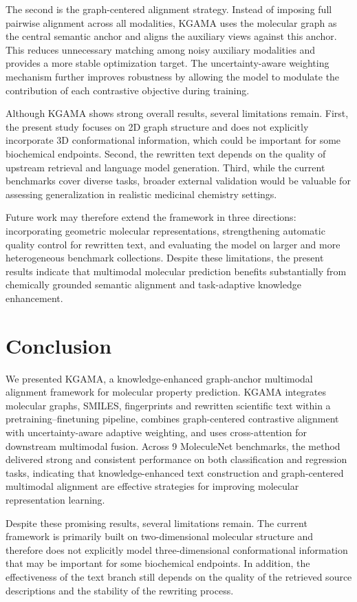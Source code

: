 \documentclass[webpdf,contemporary,large]{oup-authoring-template}%
\begin{document}
The second is the graph-centered alignment strategy. Instead of imposing full pairwise alignment across all modalities, KGAMA uses the molecular graph as the central semantic anchor and aligns the auxiliary views against this anchor. This reduces unnecessary matching among noisy auxiliary modalities and provides a more stable optimization target. The uncertainty-aware weighting mechanism further improves robustness by allowing the model to modulate the contribution of each contrastive objective during training.

Although KGAMA shows strong overall results, several limitations remain. First, the present study focuses on 2D graph structure and does not explicitly incorporate 3D conformational information, which could be important for some biochemical endpoints. Second, the rewritten text depends on the quality of upstream retrieval and language model generation. Third, while the current benchmarks cover diverse tasks, broader external validation would be valuable for assessing generalization in realistic medicinal chemistry settings.

Future work may therefore extend the framework in three directions: incorporating geometric molecular representations, strengthening automatic quality control for rewritten text, and evaluating the model on larger and more heterogeneous benchmark collections. Despite these limitations, the present results indicate that multimodal molecular prediction benefits substantially from chemically grounded semantic alignment and task-adaptive knowledge enhancement.

\section{Conclusion}
We presented KGAMA, a knowledge-enhanced graph-anchor multimodal alignment framework for molecular property prediction. KGAMA integrates molecular graphs, SMILES, fingerprints and rewritten scientific text within a pretraining--finetuning pipeline, combines graph-centered contrastive alignment with uncertainty-aware adaptive weighting, and uses cross-attention for downstream multimodal fusion. Across 9 MoleculeNet benchmarks, the method delivered strong and consistent performance on both classification and regression tasks, indicating that knowledge-enhanced text construction and graph-centered multimodal alignment are effective strategies for improving molecular representation learning.

Despite these promising results, several limitations remain. The current framework is primarily built on two-dimensional molecular structure and therefore does not explicitly model three-dimensional conformational information that may be important for some biochemical endpoints. In addition, the effectiveness of the text branch still depends on the quality of the retrieved source descriptions and the stability of the rewriting process.
\end{document}
